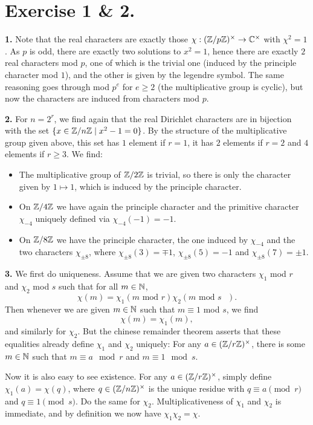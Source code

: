 \documentclass[a4paper,11pt]{article}
\begin{document}
\section*{Exercise 1 \& 2.}
\textbf{1.} Note that the real characters are exactly those $\chi:
(\mathbb{Z}/p\mathbb{Z})^\times \to \mathbb{C}^\times$  with $\chi^2 = 1$.
As $p$ is odd, there are exactly two solutions to $x^2=1$, hence there are exactly
$2$ real characters mod $p$, one of which is the trivial
one (induced by the principle character mod $1$), and the other is given by the 
legendre symbol. The same reasoning goes through mod $p^e$ for $e \geq 2$ (the
multiplicative group is cyclic), but now the characters are induced from
characters mod $p$.

\textbf{2.}
For $n = 2^r$, we find again that the real Dirichlet characters are in
bijection with the set $\{x \in \mathbb{Z}/n\mathbb{Z} \mid x^2 -1 = 0\}$. By the structure of the 
multiplicative group given above, this set has $1$ element if $r=1$, it has $2$
elements if $r = 2$ and $4$ elements if $r \geq 3$. We find:
\begin{itemize}
    \item The multiplicative group of $\mathbb{Z}/2\mathbb{Z}$ is trivial, so there is only the
        character given by $1 \mapsto 1$, which is induced by the principle
        character. 
    \item On $\mathbb{Z}/4\mathbb{Z}$ we have again the principle character and the primitive
        character $\chi_{-4}$ uniquely defined via $\chi_{-4}(-1) = -1$.
    \item On $\mathbb{Z}/8\mathbb{Z}$ we have the principle character, the one induced by $\chi_{-4}$ 
        and the two characters $\chi_{\pm 8}$, where $\chi_{\pm 8}(3) = \mp 1$, 
        $\chi_{\pm 8}(5) = -1$ and $\chi_{\pm 8}(7) = \pm 1$. 
\end{itemize}

\textbf{3.} 
We first do uniqueness. Assume that we are given two characters $\chi_1$ mod $r$ 
and $\chi_2$ mod $s$ such that for all $m \in \mathbb{N}$, 
\[
    \chi(m) = \chi_1(m \text{ mod $r$}) \chi_2(m \text{ mod $s$ }).
\]
Then whenever we are given $m \in \mathbb{N}$ such that $m \equiv 1$ mod $s$, we find 
\[
    \chi(m) = \chi_1(m),
\]
and similarly for $\chi_2$. But the chinese remainder theorem asserts that
these equalities already define $\chi_1$ and $\chi_2$ uniquely: For any $a \in
(\mathbb{Z}/r\mathbb{Z})^\times$, there is some $m \in \mathbb{N}$ such that $m \equiv a \mod r$ and 
$m \equiv 1 \mod s$. 

Now it is also easy to see existence. For any $a \in (\mathbb{Z}/r\mathbb{Z})^\times$, simply define
$\chi_1(a) = \chi(q)$, where $q \in (\mathbb{Z}/n\mathbb{Z})^\times$ is the unique residue with
$q \equiv a \pmod r$ and $q \equiv 1 \pmod s$. Do the same for $\chi_2$.
Multiplicativeness of $\chi_1$ and $\chi_2$ is immediate, and
by definition we now have $\chi_1 \chi_2 = \chi$. 
\end{document}

